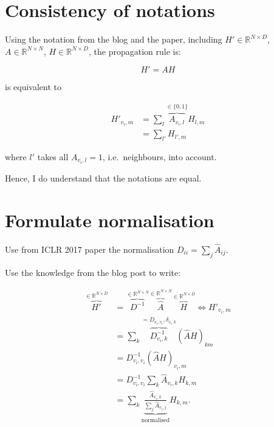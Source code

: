 \section{Consistency of notations}%
\label{sec:consistency}

Using the notation from the blog and the paper, including $H'\in\mathbb{R}^{N\times D}$, $A\in\mathbb{R}^{N\times N}$, $H\in\mathbb{R}^{N\times D}$, the propagation rule is:

\begin{equation}
	H' = A H
\end{equation}

is equivalent to

\begin{equation}
	\begin{split}
		H'_{v_i, m} & = \sum_l \overbrace{A_{v_i, l}}^{\in \{0, 1\}} H_{l, m} \\
		            & = \sum_{l'} H_{l',m}
	\end{split}
\end{equation}

where $l'$ takes all $A_{v_i,l}=1$, i.e.\ neighbours, into account.

Hence, I do understand that the notations are equal.

\section{Formulate normalisation}

Use from ICLR 2017 paper the normalisation $D_{ii} = \sum_j \hat{A}_{ij}$.

Use the knowledge from the blog post to write:

\begin{equation}
	\begin{split}
		\overbrace{H'}^{\in \mathbb{R}^{N\times D}} & = \overbrace{D^{-1}}^{\in\mathbb{R}^{N\times N}} \overbrace{\hat{A}}^{\in \mathbb{R}^{N\times N}} \overbrace{H}^{\in\mathbb{R}^{N\times D}}
			\Leftrightarrow H'_{v_i, m}  \\
			 & = \sum_k \overbrace{D^{-1}_{v_i,k}}^{=D_{v_i,v_i}, \delta_{v_i, k}} {(\hat{A} H)}_{km} \\
			& = D^{-1}_{v_i, v_i} (\hat{A} H)_{v_i, m} \\
			& = D^{-1}_{{v}_i, v_i} \sum_k \hat{A}_{v_i, k} H_{k, m} \\
			& = \sum_k \underbrace{\frac{\hat{A}_{v_i, k}}{\sum_j \hat{A}_{v_i, j}}}_{\text{normalised}} H_{k, m}.
	\end{split}
\end{equation}

